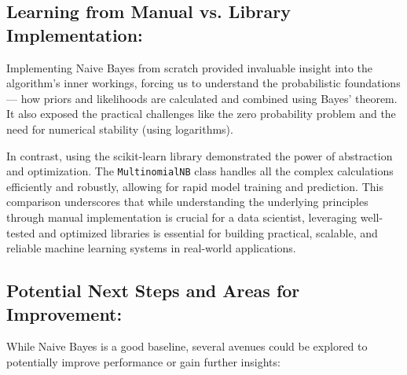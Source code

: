 \documentclass[12pt,letterpaper]{article}
\begin{document}
\subsection*{Learning from Manual vs. Library Implementation:}

Implementing Naive Bayes from scratch provided invaluable insight into the algorithm's inner workings, forcing us to understand the probabilistic foundations --- how priors and likelihoods are calculated and combined using Bayes' theorem. It also exposed the practical challenges like the zero probability problem and the need for numerical stability (using logarithms).

In contrast, using the scikit-learn library demonstrated the power of abstraction and optimization. The \texttt{MultinomialNB} class handles all the complex calculations efficiently and robustly, allowing for rapid model training and prediction. This comparison underscores that while understanding the underlying principles through manual implementation is crucial for a data scientist, leveraging well-tested and optimized libraries is essential for building practical, scalable, and reliable machine learning systems in real-world applications.

\subsection*{Potential Next Steps and Areas for Improvement:}

While Naive Bayes is a good baseline, several avenues could be explored to potentially improve performance or gain further insights:
\end{document}
